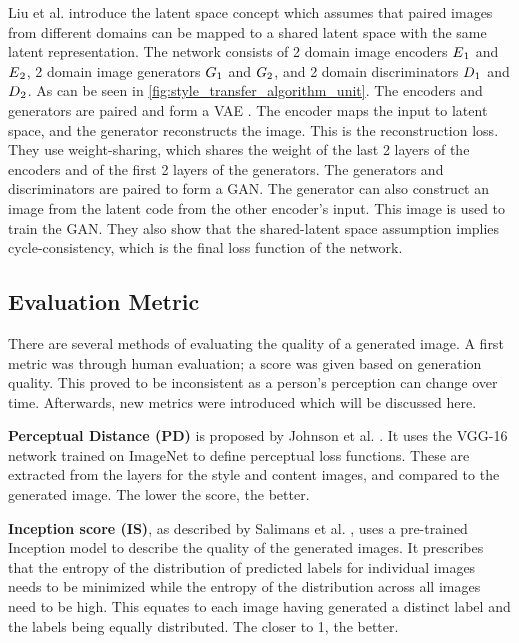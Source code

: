 Liu et al. \cite{Liu2017} introduce the latent space concept which assumes that paired images from different domains can be mapped to a shared latent space with the same latent representation.
The network consists of 2 domain image encoders $E\textsubscript{$1$}$ and $E\textsubscript{$2$}$, 2 domain image generators $G\textsubscript{$1$}$ and $G\textsubscript{$2$}$, and 2 domain discriminators $D\textsubscript{$1$}$ and $D\textsubscript{$2$}$.
As can be seen in \ref{fig:style_transfer_algorithm_unit}.
The encoders and generators are paired and form a \gls{VAE} \cite{kingma2022}.
The encoder maps the input to latent space, and the generator reconstructs the image.
This is the reconstruction loss.
They use weight-sharing, which shares the weight of the last 2 layers of the encoders and of the first 2 layers of the generators.
The generators and discriminators are paired to form a \gls{GAN}.
The generator can also construct an image from the latent code from the other encoder's input.
This image is used to train the \gls{GAN}.
They also show that the shared-latent space assumption implies cycle-consistency, which is the final loss function of the network.

\subsection{Evaluation Metric}
\label{sec:style_transfer_metrics}
There are several methods of evaluating the quality of a generated image. 
A first metric was through human evaluation; a score was given based on generation quality.
This proved to be inconsistent as a person's perception can change over time.
Afterwards, new metrics were introduced which will be discussed here. \cite{Hoyez2022}

\textbf{Perceptual Distance (PD)} is proposed by Johnson et al. \cite{Johnson2016}.
It uses the VGG-16 network \cite{Simonyan2015} trained on ImageNet \cite{Deng2009} to define perceptual loss functions.
These are extracted from the layers for the style and content images, and compared to the generated image.
The lower the score, the better.

\textbf{Inception score (IS)}, as described by Salimans et al. \cite{Salimans2016}, uses a pre-trained Inception model \cite{Szegedy2015} to describe the quality of the generated images.
It prescribes that the entropy of the distribution of predicted labels for individual images needs to be minimized while the entropy of the distribution across all images need to be high.
This equates to each image having generated a distinct label and the labels being equally distributed.
The closer to 1, the better.

